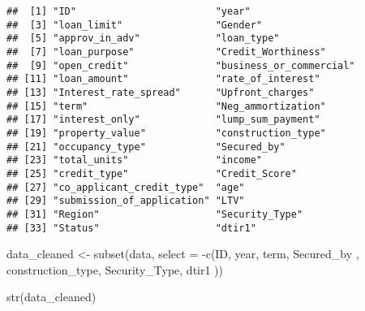 \documentclass[
]{article}
\newenvironment{Shaded}{\begin{snugshade}}{\end{snugshade}}
\newcommand{\AttributeTok}[1]{\textcolor[rgb]{0.77,0.63,0.00}{#1}}
\newcommand{\FunctionTok}[1]{\textcolor[rgb]{0.00,0.00,0.00}{#1}}
\newcommand{\NormalTok}[1]{#1}
\newcommand{\OtherTok}[1]{\textcolor[rgb]{0.56,0.35,0.01}{#1}}
\newcommand{\SpecialCharTok}[1]{\textcolor[rgb]{0.00,0.00,0.00}{#1}}
\begin{document}
\begin{verbatim}
##  [1] "ID"                        "year"                     
##  [3] "loan_limit"                "Gender"                   
##  [5] "approv_in_adv"             "loan_type"                
##  [7] "loan_purpose"              "Credit_Worthiness"        
##  [9] "open_credit"               "business_or_commercial"   
## [11] "loan_amount"               "rate_of_interest"         
## [13] "Interest_rate_spread"      "Upfront_charges"          
## [15] "term"                      "Neg_ammortization"        
## [17] "interest_only"             "lump_sum_payment"         
## [19] "property_value"            "construction_type"        
## [21] "occupancy_type"            "Secured_by"               
## [23] "total_units"               "income"                   
## [25] "credit_type"               "Credit_Score"             
## [27] "co_applicant_credit_type"  "age"                      
## [29] "submission_of_application" "LTV"                      
## [31] "Region"                    "Security_Type"            
## [33] "Status"                    "dtir1"
\end{verbatim}

\begin{Shaded}
\begin{Highlighting}[]
\NormalTok{data\_cleaned }\OtherTok{\textless{}{-}} \FunctionTok{subset}\NormalTok{(data, }\AttributeTok{select =} \SpecialCharTok{{-}}\FunctionTok{c}\NormalTok{(ID, year, term, Secured\_by , construction\_type,  Security\_Type, dtir1 ))}

\FunctionTok{str}\NormalTok{(data\_cleaned)}
\end{Highlighting}
\end{Shaded}
\end{document}
